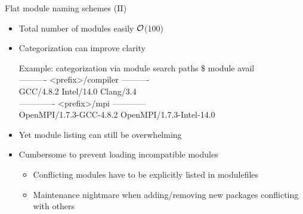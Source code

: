 \documentclass[10pt,xcolor={usenames,dvipsnames}]{beamer}
\begin{document}

\begin{frame}{Flat module naming schemes (II)}
\begin{itemize}
    \item
        Total number of modules easily $\cal{O}$(100)
    \item
        Categorization can improve clarity\\
        \enskip
        \begin{minipage}{0.9\textwidth}
            \begin{exampleblock}{Example: categorization via module search paths}
                \ttfamily
                \$ module avail\\
                ---------- <prefix>/compiler ----------\\
                GCC/4.8.2 \quad Intel/14.0 \quad Clang/3.4\\
                ------------- <prefix>/mpi ------------\\
                OpenMPI/1.7.3-GCC-4.8.2 \quad OpenMPI/1.7.3-Intel-14.0
            \end{exampleblock}
        \end{minipage}
    \smallskip
    \item
        Yet module listing can still be overwhelming
    \item
        Cumbersome to prevent loading incompatible modules
        \begin{itemize}
            \item
                Conflicting modules have to be explicitly listed in modulefiles
            \item
                Maintenance nightmare when adding/removing new packages
                conflicting with others
        \end{itemize}
\end{itemize}
\end{frame}

\end{document}
